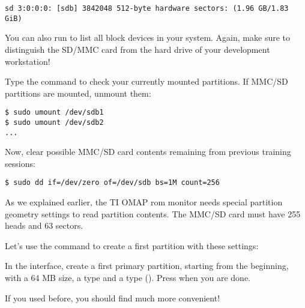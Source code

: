 \begin{verbatim}
sd 3:0:0:0: [sdb] 3842048 512-byte hardware sectors: (1.96 GB/1.83 GiB)
\end{verbatim}


You can also run  to list all block devices
in your system. Again, make sure to distinguish the SD/MMC card from the
hard drive of your development workstation!

Type the  command to check your currently mounted
partitions. If MMC/SD partitions are mounted, unmount them:

\begin{verbatim}
$ sudo umount /dev/sdb1
$ sudo umount /dev/sdb2
...
\end{verbatim}

Now, clear possible MMC/SD card contents remaining from previous training
sessions:

\begin{verbatim}
$ sudo dd if=/dev/zero of=/dev/sdb bs=1M count=256
\end{verbatim}

As we explained earlier, the TI OMAP rom monitor needs special partition geometry settings
to read partition contents. The MMC/SD card must have 255 heads and 63 sectors.

Let's use the  command to create a first partition with these settings:


In the  interface, create a first primary partition, starting from the beginning,
with a 64 MB size, a  type and a  type ().
Press  when you are done.

If you used  before, you should find  much more convenient!

